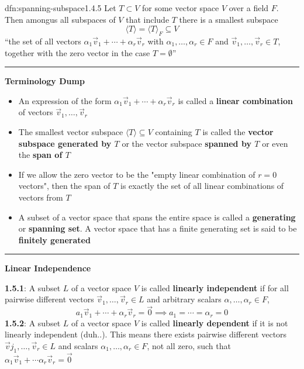 \documentclass[landscape, 8pt]{extarticle}
\begin{document}
\begin{multicols}{3}
\begin{dfn}{dfn:spanning-subspace}{1.4.5}
    Let $T \subset V$ for some vector space $V$ over a field $F$. Then amongus all subspaces of $V$ that include $T$ there is a smallest subspace
    \[\langle T \rangle = \langle T \rangle_{F} \subseteq V\]
    ``the set of all vectors $\alpha_{1}\vec{v}_{1} + \cdots + \alpha_{r}\vec{v}_{r}$ with $\alpha_{1},\dots,\alpha_{r}\in F$ and $\vec{v}_{1},\dots,\vec{v}_{r}\in T$, together with the zero vector in the case $T = \emptyset$''


    \noindent\rule{\textwidth}{0.2pt}

    \textbf{Terminology Dump}
    \begin{itemize}
        \setlength\itemsep{0em}
        \item An expression of the form $\alpha_{1}\vec{v}_{1}+\cdots+\alpha_{r}\vec{v}_{r}$ is called a \newline\textbf{linear combination} of vectors $\vec{v}_{1},\dots,\vec{v}_{r}$
        \item The smallest vector subspace $\langle T \rangle \subseteq V$ containing $T$ is called the \textbf{vector subspace generated by $T$} or the vector subspace \textbf{spanned by $T$} or even the \textbf{span of $T$}
        \item If we allow the zero vector to be the "empty linear combination of $r = 0$ vectors", then the span of $T$ is exactly the set of all linear combinations of vectors from $T$ 
        \item[\textbf{1.4.7}:] A subset of a vector space that spans the entire space is called a \textbf{generating} or \textbf{spanning set}. A vector space that has a finite generating set is said to be \textbf{finitely generated}
    \end{itemize}

    \vspace{-5pt}
    \noindent\rule{\textwidth}{0.2pt}

    \textbf{Linear Independence}
    \vspace{5pt}

    \textbf{1.5.1}: A subset $L$ of a vector space $V$ is called \textbf{linearly \newline independent} if for all pairwise different vectors $\vec{v}_{1},\dots,\vec{v}_{r}\in L$ and arbitrary scalars $\alpha,\dots,\alpha_{r}\in F$,
    \[a_{1}\vec{v}_{1} + \cdots + \alpha_{r}\vec{v}_{r} = \vec{0} \implies a_{1} = \cdots = \alpha_{r} = 0\]
    \textbf{1.5.2}: A subset $L$ of a vector space $V$ is called \textbf{linearly \newline dependent} if it is not linearly independent (duh..). This means there exists pairwise different vectors $\vec{v}j_{1},\dots,\vec{v}_{r}\in L$ and scalars $\alpha_{1},\dots,\alpha_{r}\in F$, not all zero, such that $\alpha_{1}\vec{v}_{1} + \cdots \alpha_{r}\vec{v}_{r} = \vec{0}$
\end{dfn}


\end{multicols}
\end{document}
